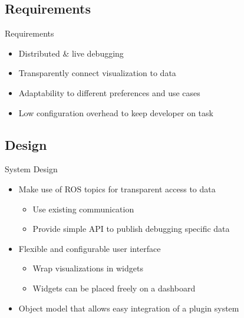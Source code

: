 \documentclass[compress]{beamer}
\begin{document}
\subsection{Requirements}
\begin{frame}{Requirements}
\begin{itemize}
\item Distributed \& live debugging
\item Transparently connect visualization to data
\item Adaptability to different preferences and use cases
\item Low configuration overhead to keep developer on task
\end{itemize}
\end{frame}

\subsection{Design}

\begin{frame}{System Design}
\begin{itemize}
\item Make use of ROS topics for transparent access to data
	\begin{itemize}
	\item Use existing communication
	\item Provide simple API to publish debugging specific data
	\end{itemize}
\item Flexible and configurable user interface
	\begin{itemize}
	\item Wrap visualizations in widgets
	\item Widgets can be placed freely on a dashboard
	\end{itemize}
\item Object model that allows easy integration of a plugin system
\end{itemize}
\end{frame}
\end{document}
